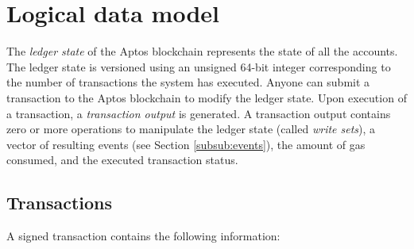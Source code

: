 \documentclass{article}
\begin{document}
\section{Logical data model}
\label{sec:logical}

The \emph{ledger state} of the Aptos blockchain represents the state of all the accounts. The ledger state is versioned using an unsigned 64-bit integer corresponding to the number of transactions the system has executed. Anyone can submit a transaction to the Aptos blockchain to modify the ledger state. Upon execution of a transaction, a \emph{transaction output} is generated.  A transaction output contains zero or more operations to manipulate the ledger state (called \emph{write sets}), a vector of resulting events (see Section \ref{subsub:events}), the amount of gas consumed, and the executed transaction status.

\subsection{Transactions}

A signed transaction contains the following information:
\end{document}
